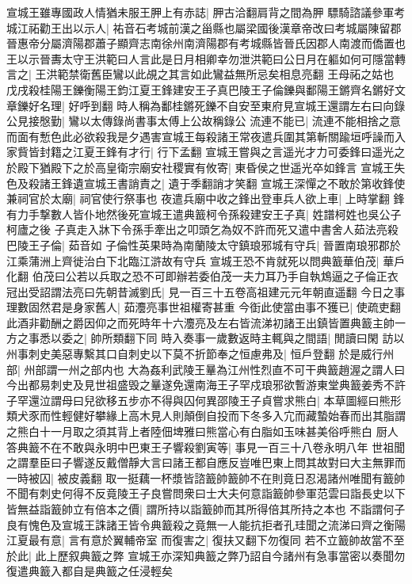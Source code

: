 宣城王雖專國政人情猶未服王胛上有赤誌|{
	胛古洽翻肩背之間為胛}
驃騎諮議參軍考城江祏勸王出以示人|{
	祐音石考城前漢之甾縣也屬梁國後漢章帝改曰考城屬陳留郡晉惠帝分屬濟陽郡蕭子顯齊志南徐州南濟陽郡有考城縣皆晉氏因郡人南渡而僑置也}
王以示晉夀太守王洪範曰人言此是日月相卿幸勿泄洪範曰公日月在軀如何可隱當轉言之|{
	王洪範禁衛舊臣鸞以此覘之其言如此鸞益無所忌矣相息亮翻}
王母祏之姑也　戊戌殺桂陽王鑠衡陽王鈞江夏王鋒建安王子真巴陵王子倫鑠與鄱陽王鏘齊名鏘好文章鑠好名理|{
	好呼到翻}
時人稱為鄱桂鏘死鑠不自安至東府見宣城王還謂左右曰向錄公見接慇勤|{
	鸞以太傳錄尚書事太傅上公故稱錄公}
流連不能已|{
	流連不能相捨之意}
而面有慙色此必欲殺我是夕遇害宣城王每殺諸王常夜遣兵圍其第斬關踰垣呼譟而入家貲皆封籍之江夏王鋒有才行|{
	行下孟翻}
宣城王嘗與之言遥光才力可委鋒曰遥光之於殿下猶殿下之於高皇衛宗廟安社稷實有攸寄|{
	東昏侯之世遥光卒如鋒言}
宣城王失色及殺諸王鋒遺宣城王書誚責之|{
	遺于季翻誚才笑翻}
宣城王深憚之不敢於第收鋒使兼祠官於太廟|{
	祠官使行祭事也}
夜遣兵廟中收之鋒出登車兵人欲上車|{
	上時掌翻}
鋒有力手撃數人皆仆地然後死宣城王遣典籖柯令孫殺建安王子真|{
	姓譜柯姓也吳公子柯廬之後}
子真走入牀下令孫手牽出之叩頭乞為奴不許而死又遣中書舍人茹法亮殺巴陵王子倫|{
	茹音如}
子倫性英果時為南蘭陵太守鎮琅邪城有守兵|{
	晉置南琅邪郡於江乘蒲洲上齊徙治白下北臨江滸故有守兵}
宣城王恐不肯就死以問典籖華伯茂|{
	華戶化翻}
伯茂曰公若以兵取之恐不可即辦若委伯茂一夫力耳乃手自執鴆逼之子倫正衣冠出受詔謂法亮曰先朝昔滅劉氏|{
	見一百三十五卷高祖建元元年朝直遥翻}
今日之事理數固然君是身家舊人|{
	茹灋亮事世祖權寄甚重}
今衘此使當由事不獲已|{
	使疏吏翻}
此酒非勸酬之爵因仰之而死時年十六灋亮及左右皆流涕初諸王出鎮皆置典籖主帥一方之事悉以委之|{
	帥所類翻下同}
時入奏事一歲數返時主輒與之間語|{
	閒讀曰閑}
訪以州事刺史美惡專繫其口自刺史以下莫不折節奉之恒慮弗及|{
	恒戶登翻}
於是威行州部|{
	州部謂一州之部内也}
大為姦利武陵王曅為江州性烈直不可干典籖趙渥之謂人曰今出都易刺史及見世祖盛毁之曅遂免還南海王子罕戍琅邪欲暫游東堂典籖姜秀不許子罕還泣謂母曰兒欲移五步亦不得與囚何異邵陵王子貞嘗求熊白|{
	本草圖經曰熊形類犬豕而性輕健好攀緣上高木見人則顛倒自投而下冬多入宂而藏蟄始春而出其脂謂之熊白十一月取之須其背上者陸佃埤雅曰熊當心有白脂如玉味甚美俗呼熊白}
厨人答典籖不在不敢與永明中巴東王子響殺劉寅等|{
	事見一百三十八卷永明八年}
世祖聞之謂羣臣曰子響遂反戴僧靜大言曰諸王都自應反豈唯巴東上問其故對曰大主無罪而一時被囚|{
	被皮義翻}
取一挺藕一杯漿皆諮籖帥籖帥不在則竟日忍渴諸州唯聞有籖帥不聞有刺史何得不反竟陵王子良嘗問衆曰士大夫何意詣籖帥參軍范雲曰詣長史以下皆無益詣籖帥立有倍本之價|{
	謂所持以詣籖帥而其所得倍其所持之本也}
不詣謂何子良有愧色及宣城王誅諸王皆令典籖殺之竟無一人能抗拒者孔珪聞之流涕曰齊之衡陽江夏最有意|{
	言有意於翼輔帝室}
而復害之|{
	復扶又翻下勿復同}
若不立籖帥故當不至於此|{
	此上歷叙典籖之弊}
宣城王亦深知典籖之弊乃詔自今諸州有急事當密以奏聞勿復遣典籖入都自是典籖之任浸輕矣

